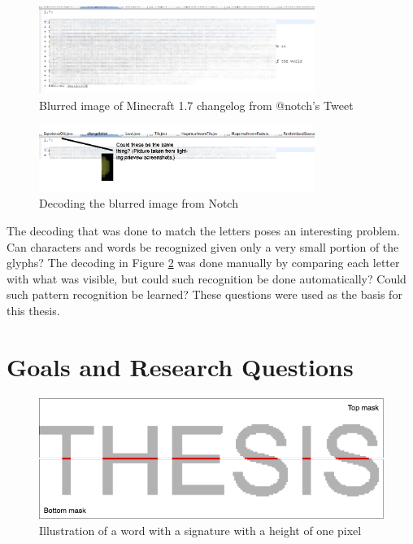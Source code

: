 \begin{figure}[h]
    \centering
    \includegraphics[width=0.8\textwidth]{fig/chapter1/notch_eclipse.png}
    \caption{Blurred image of Minecraft 1.7 changelog from @notch's Tweet}
    \label{fig:notch_imgur}
\end{figure}

\begin{figure}[ht]
    \centering
    \includegraphics[width=0.8\textwidth]{fig/chapter1/notch_eclipse_decoded.png}
    \caption{Decoding the blurred image from Notch}
    \label{fig:notch_eclipse_decoded}
\end{figure}

\newpage
The decoding that was done to match the letters poses an interesting problem. Can characters and words be recognized given only a very small portion of the glyphs? The decoding in Figure \ref{fig:notch_eclipse_decoded} was done manually by comparing each letter with what was visible, but could such recognition be done automatically? Could such pattern recognition be learned? These questions were used as the basis for this thesis.


\section{Goals and Research Questions}
\label{sec:goals_and_research_questions}
\begin{figure}[ht]
    \centering
    \includegraphics[width=1.\textwidth]{fig/chapter1/signature2.png}
    \caption{Illustration of a word with a signature with a height of one pixel}
    \label{fig:thesis-signature}
\end{figure}

